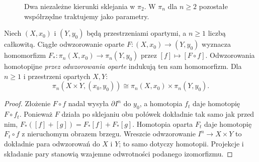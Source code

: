 \begin{figure}[!htbp]
\centering
{}
\caption{Dwa niezależne kierunki sklejania w $\pi_2$.
W $\pi_n$ dla $n\geq2$ pozostałe współrzędne
traktujemy jako parametry.}
\label{fig:pi2-sklejanie}
\end{figure}

\begin{stwierdzenie}
\label{prop:pi-n-funktor}
Niech $(X,x_0)$ i $(Y,y_0)$ będą przestrzeniami opartymi,
a $n\geq1$ liczbą całkowitą.
Ciągłe odwzorowanie oparte $F:(X,x_0)\to(Y,y_0)$ wyznacza
homomorfizm $F_*:\pi_n(X,x_0)\to\pi_n(Y,y_0)$
przez $[f]\mapsto[F\circ f]$.
Odwzorowania homotopijne \emph{przez odwzorowania oparte}
indukują ten sam homomorfizm. Dla
$n\geq1$ i przestrzeni opartych $X,Y$:
\[
 \pi_n(X\times Y,(x_0,y_0))
 \cong \pi_n(X,x_0)\times\pi_n(Y,y_0).
\]
\end{stwierdzenie}
\begin{proof}
Złożenie $F\circ f$ nadal wysyła
$\partial I^n$ do $y_0$, a homotopia
$f_t$ daje homotopię $F\circ f_t$.
Ponieważ $F$ działa po sklejaniu
obu połówek dokładnie tak samo
jak przed nim, $F_*([f]+[g])
=F_*[f]+F_*[g]$. Homotopia
oparta $F_t$ daje homotopię
$F_t\circ f$ z nieruchomym
obrazem brzegu. Wreszcie odwzorowanie
$I^n\to X\times Y$ to dokładnie
para odwzorowań do $X$ i $Y$; to
samo dotyczy homotopii.
Projekcje i składanie pary
stanowią wzajemne odwrotności
podanego izomorfizmu.
\end{proof}

